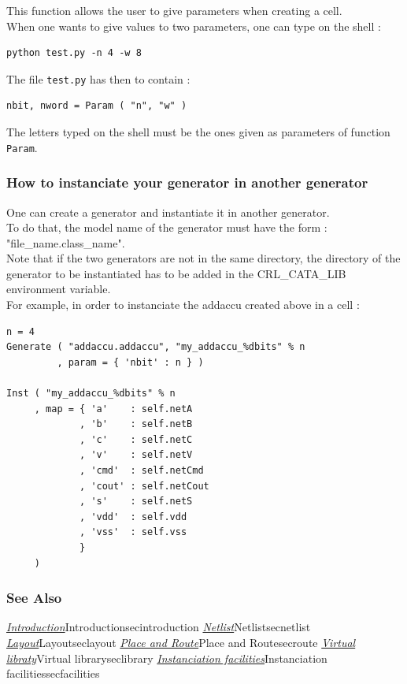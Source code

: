 This function allows the user to give parameters when creating a cell.\\
\indent When one wants to give values to two parameters, one can type on the shell :
\begin{verbatim}
python test.py -n 4 -w 8
\end{verbatim}
\indent The file \verb-test.py- has then to contain :
\begin{verbatim}
nbit, nword = Param ( "n", "w" )
\end{verbatim}
\indent The letters typed on the shell must be the ones given as parameters of function \verb-Param-.

\subsubsection{How to instanciate your generator in another generator}

One can create a generator and instantiate it in another generator.\\
\indent To do that, the model name of the generator must have the form : "file\_name.class\_name".\\    
\indent Note that if the two generators are not in the same directory, the directory of the generator to be instantiated has to be added in the CRL\_CATA\_LIB environment variable.\\

\indent For example, in order to instanciate the addaccu created above in a cell :
\begin{verbatim}
n = 4
Generate ( "addaccu.addaccu", "my_addaccu_%dbits" % n
         , param = { 'nbit' : n } )

Inst ( "my_addaccu_%dbits" % n
     , map = { 'a'    : self.netA
             , 'b'    : self.netB
             , 'c'    : self.netC
             , 'v'    : self.netV
             , 'cmd'  : self.netCmd
             , 'cout' : self.netCout
             , 's'    : self.netS
             , 'vdd'  : self.vdd
             , 'vss'  : self.vss
             }
     )
\end{verbatim}

\begin{htmlonly}

\subsubsection{See Also}

\hyperref[ref]{\emph{Introduction}}{}{Introduction}{secintroduction}
\hyperref[ref]{\emph{Netlist}}{}{Netlist}{secnetlist}
\hyperref[ref]{\emph{Layout}}{}{Layout}{seclayout}
\hyperref[ref]{\emph{Place and Route}}{}{Place and Route}{secroute}
\hyperref[ref]{\emph{Virtual libraty}}{}{Virtual library}{seclibrary}
\hyperref[ref]{\emph{Instanciation facilities}}{}{Instanciation facilities}{secfacilities}

\end{htmlonly}

